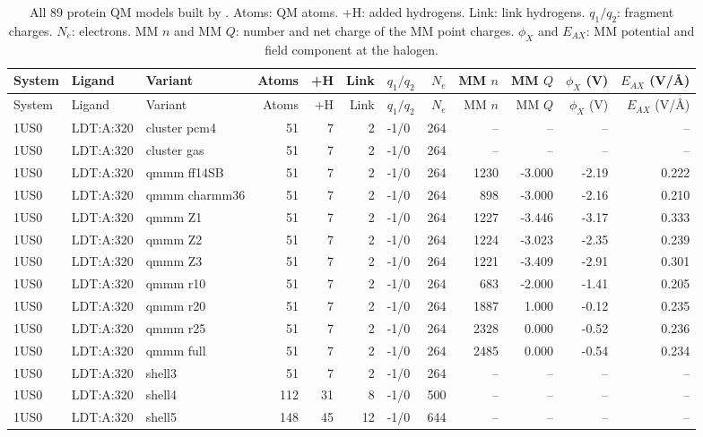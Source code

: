 {\scriptsize
\setlength{\tabcolsep}{3pt}
\begin{longtable}{lllrrrlrrrrr}
\caption{All 89 protein QM models built by \BX{}. Atoms: QM atoms. +H: added hydrogens. Link: link hydrogens. $q_1/q_2$: fragment charges. $N_e$: electrons. MM $n$ and MM $Q$: number and net charge of the MM point charges. $\phi_X$ and $E_{AX}$: MM potential and field component at the halogen.}\label{tab:models}\\
\toprule
System & Ligand & Variant & Atoms & +H & Link & $q_1/q_2$ & $N_e$ & MM $n$ & MM $Q$ & $\phi_X$ (V) & $E_{AX}$ (V/\AA)\\
\midrule
\endfirsthead
\toprule
System & Ligand & Variant & Atoms & +H & Link & $q_1/q_2$ & $N_e$ & MM $n$ & MM $Q$ & $\phi_X$ (V) & $E_{AX}$ (V/\AA)\\
\midrule
\endhead
\bottomrule
\endlastfoot
1US0 & LDT:A:320 & cluster pcm4 & 51 & 7 & 2 & -1/0 & 264 & -- & -- & -- & --\\
1US0 & LDT:A:320 & cluster gas & 51 & 7 & 2 & -1/0 & 264 & -- & -- & -- & --\\
1US0 & LDT:A:320 & qmmm ff14SB & 51 & 7 & 2 & -1/0 & 264 & 1230 & -3.000 & -2.19 & 0.222\\
1US0 & LDT:A:320 & qmmm charmm36 & 51 & 7 & 2 & -1/0 & 264 & 898 & -3.000 & -2.16 & 0.210\\
1US0 & LDT:A:320 & qmmm Z1 & 51 & 7 & 2 & -1/0 & 264 & 1227 & -3.446 & -3.17 & 0.333\\
1US0 & LDT:A:320 & qmmm Z2 & 51 & 7 & 2 & -1/0 & 264 & 1224 & -3.023 & -2.35 & 0.239\\
1US0 & LDT:A:320 & qmmm Z3 & 51 & 7 & 2 & -1/0 & 264 & 1221 & -3.409 & -2.91 & 0.301\\
1US0 & LDT:A:320 & qmmm r10 & 51 & 7 & 2 & -1/0 & 264 & 683 & -2.000 & -1.41 & 0.205\\
1US0 & LDT:A:320 & qmmm r20 & 51 & 7 & 2 & -1/0 & 264 & 1887 & 1.000 & -0.12 & 0.235\\
1US0 & LDT:A:320 & qmmm r25 & 51 & 7 & 2 & -1/0 & 264 & 2328 & 0.000 & -0.52 & 0.236\\
1US0 & LDT:A:320 & qmmm full & 51 & 7 & 2 & -1/0 & 264 & 2485 & 0.000 & -0.54 & 0.234\\
1US0 & LDT:A:320 & shell3 & 51 & 7 & 2 & -1/0 & 264 & -- & -- & -- & --\\
1US0 & LDT:A:320 & shell4 & 112 & 31 & 8 & -1/0 & 500 & -- & -- & -- & --\\
1US0 & LDT:A:320 & shell5 & 148 & 45 & 12 & -1/0 & 644 & -- & -- & -- & --\\

\end{longtable}}
